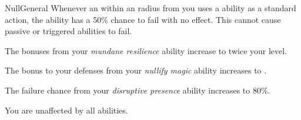 \begin{feat}{Null}{General}
         Whenever an  within an \medarea radius from you uses a  ability as a standard action, the ability has a 50\% chance to fail with no effect.
        This cannot cause passive or triggered abilities to fail.

         The bonuses from your \textit{mundane resilience} ability increase to twice your level.

         The bonus to your defenses from your \textit{nullify magic} ability increases to .

         The failure chance from your \textit{disruptive presence} ability increases to 80\%.

         You are unaffected by all  abilities.
    \end{feat}

